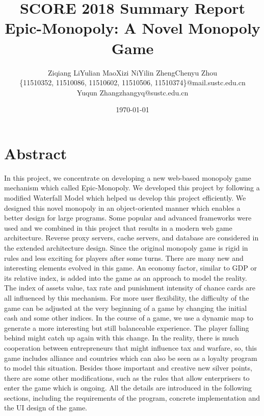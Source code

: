\documentclass[a4paper,11pt]{article}
\begin{document}

\title{SCORE 2018 Summary Report\\Epic-Monopoly: A Novel Monopoly Game}
\author{\small Ziqiang Li\quad Yulian Mao\quad Xizi Ni\quad Yilin Zheng\quad Chenyu Zhou\\
\small \{11510352, 11510086, 11510602, 11510506, 11510374\}@mail.sustc.edu.cn\\
Yuqun Zhang\quad zhangyq@sustc.edu.cn}
\date{\today}



\maketitle


\section{Abstract}
In this project, we concentrate on developing a new web-based monopoly game mechanism which called Epic-Monopoly. We developed this project by following a modified Waterfall Model which helped us develop this project efficiently. We designed this novel monopoly in an object-oriented manner which enables a better design for large programs. Some popular and advanced frameworks were used and we combined in this project that results in a modern web game architecture. Reverse proxy servers, cache servers, and database are considered in the extended architecture design. Since the original monopoly game is rigid in rules and less exciting for players after some turns. There are many new and interesting elements evolved in this game. An economy factor, similar to GDP or its relative index, is added into the game as an approach to model the reality. The index of assets value, tax rate and punishment intensity of chance cards are all influenced by this mechanism. For more user flexibility, the difficulty of the game can be adjusted at the very beginning of a game by changing the initial cash and some other indices. In the course of a game, we use a dynamic map to generate a more interesting but still balanceable experience. The player falling behind might catch up again with this change. In the reality, there is much cooperation between entrepreneurs that might influence tax and warfare, so, this game includes alliance and countries which can also be seen as a loyalty program to model this situation. Besides those important and creative new silver points, there are some other modifications, such as the rules that allow enterprisers to enter the game which is ongoing. All the details are introduced in the following sections, including the requirements of the program, concrete implementation and the UI design of the game.
\end{document}
